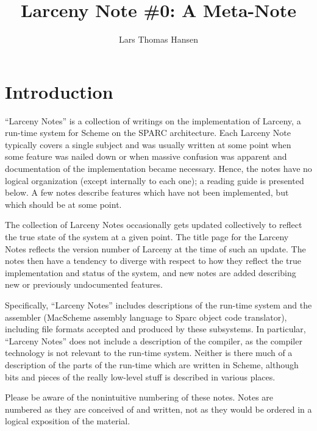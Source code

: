 

\title{Larceny Note \#0: A Meta-Note}
\author{Lars Thomas Hansen}


\maketitle

\section{Introduction}

``Larceny Notes'' is a collection of writings on the implementation of
Larceny, a run-time system for Scheme on the SPARC architecture. Each
Larceny Note typically covers a single subject and was usually written at
some point when some feature was nailed down or when massive confusion was
apparent and documentation of the implementation became necessary. Hence,
the notes have no logical organization (except internally to each one);
a reading guide is presented below. A few notes describe features which
have not been implemented, but which should be at some point.

The collection of Larceny Notes occasionally gets updated collectively to
reflect the true state of the system at a given point. The title page
for the Larceny Notes reflects the version number of Larceny at the time
of such an update. The notes then have a tendency to diverge with respect
to how they reflect the true implementation and status of the system, and
new notes are added describing new  or previously undocumented features.

Specifically, ``Larceny Notes'' includes descriptions of the run-time system
and the assembler (MacScheme assembly language to Sparc object code
translator), including file formats accepted and produced by these
subsystems.  In particular, ``Larceny Notes'' does not include a description
of the compiler, as the compiler technology is not relevant to the run-time
system.  Neither is there much of a description of the parts of the run-time
which are written in Scheme, although bits and pieces of the really low-level
stuff is described in various places.

Please be aware of the nonintuitive numbering of these notes. Notes
are numbered as they are conceived of and written, not as they would
be ordered in a logical exposition of the material.

